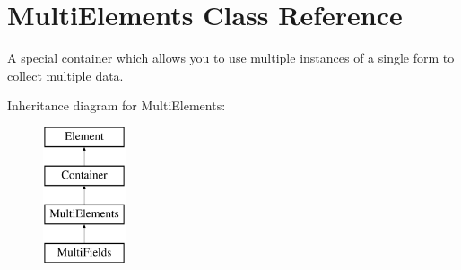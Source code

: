 \hypertarget{class_multi_elements}{
\section{MultiElements Class Reference}
\label{class_multi_elements}
}


A special container which allows you to use multiple instances of a single form to collect multiple data.  


Inheritance diagram for MultiElements:\begin{figure}[H]
\begin{center}
\leavevmode
\includegraphics[height=4.000000cm]{class_multi_elements}
\end{center}
\end{figure}
